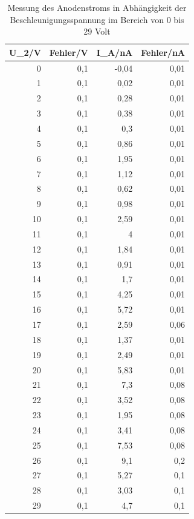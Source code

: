 \documentclass[12pt,a4paper]{article}
\begin{document}
\begin{table}[htbp]
\caption{Messung des Anodenstroms in Abhängigkeit der Beschleunigungsspannung im Bereich von 0 bis 29 Volt}
\begin{center}
\begin{tabular}{|r|r|r|r|}
\hline
\multicolumn{1}{|l|}{U\_2/V} & \multicolumn{1}{l|}{Fehler/V} & \multicolumn{1}{l|}{I\_A/nA} & \multicolumn{1}{l|}{Fehler/nA} \\ \hline
0 & 0,1 & -0,04 & 0,01 \\ \hline
1 & 0,1 & 0,02 & 0,01 \\ \hline
2 & 0,1 & 0,28 & 0,01 \\ \hline
3 & 0,1 & 0,38 & 0,01 \\ \hline
4 & 0,1 & 0,3 & 0,01 \\ \hline
5 & 0,1 & 0,86 & 0,01 \\ \hline
6 & 0,1 & 1,95 & 0,01 \\ \hline
7 & 0,1 & 1,12 & 0,01 \\ \hline
8 & 0,1 & 0,62 & 0,01 \\ \hline
9 & 0,1 & 0,98 & 0,01 \\ \hline
10 & 0,1 & 2,59 & 0,01 \\ \hline
11 & 0,1 & 4 & 0,01 \\ \hline
12 & 0,1 & 1,84 & 0,01 \\ \hline
13 & 0,1 & 0,91 & 0,01 \\ \hline
14 & 0,1 & 1,7 & 0,01 \\ \hline
15 & 0,1 & 4,25 & 0,01 \\ \hline
16 & 0,1 & 5,72 & 0,01 \\ \hline
17 & 0,1 & 2,59 & 0,06 \\ \hline
18 & 0,1 & 1,37 & 0,01 \\ \hline
19 & 0,1 & 2,49 & 0,01 \\ \hline
20 & 0,1 & 5,83 & 0,01 \\ \hline
21 & 0,1 & 7,3 & 0,08 \\ \hline
22 & 0,1 & 3,52 & 0,08 \\ \hline
23 & 0,1 & 1,95 & 0,08 \\ \hline
24 & 0,1 & 3,41 & 0,08 \\ \hline
25 & 0,1 & 7,53 & 0,08 \\ \hline
26 & 0,1 & 9,1 & 0,2 \\ \hline
27 & 0,1 & 5,27 & 0,1 \\ \hline
28 & 0,1 & 3,03 & 0,1 \\ \hline
29 & 0,1 & 4,7 & 0,1 \\ \hline
\end{tabular}
\end{center}
\label{tab:q_daten}
\end{table}
\end{document}
